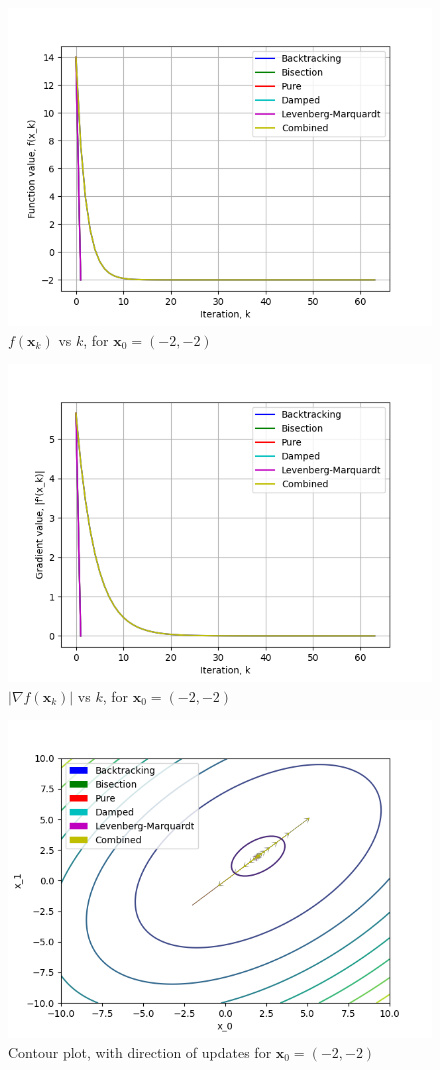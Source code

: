 \documentclass[a4paper]{article}
\begin{document}
\begin{figure}[H]
      \centering
      \includegraphics[width=.65\textwidth]{images/trid_function_vals.png}
      \caption{$f(\textbf{x}_k)$ vs $k$, for $\textbf{x}_0 = (-2, -2)$}
\end{figure}

\begin{figure}[H]
    \centering
    \includegraphics[width=.65\textwidth]{images/trid_function_grad.png}
    \caption{$|\nabla f(\textbf{x}_k)|$ vs $k$, for $\textbf{x}_0 = (-2, -2)$}
\end{figure}

\begin{figure}[H]
    \centering
    \includegraphics[width=.65\textwidth]{images/trid_function_cont.png}
    \caption{Contour plot, with direction of updates for $\textbf{x}_0 = (-2, -2)$}
\end{figure}
\end{document}
